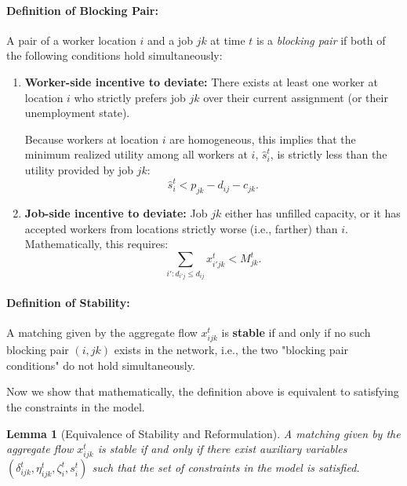 \documentclass[trsc,nonblindrev]{informs3noheader}
\newtheorem{lemma}{Lemma}
\begin{document}
\paragraph{Definition of Blocking Pair:} A pair of a worker location $i$ and a job $jk$ at time $t$ is a \textit{blocking pair} if both of the following conditions hold simultaneously:
\begin{enumerate}
    \item \textbf{Worker-side incentive to deviate:} There exists at least one worker at location $i$ who strictly prefers job $jk$ over their current assignment (or their unemployment state). 
    
    Because workers at location $i$ are homogeneous, this implies that the minimum realized utility among all workers at $i$, $\hat{s}_i^t$, is strictly less than the utility provided by job $jk$:
    \begin{equation*}
        \hat{s}_i^t < p_{jk} - d_{ij} - c_{jk}.
    \end{equation*}

    \item \textbf{Job-side incentive to deviate:} Job $jk$ either has unfilled capacity, or it has accepted workers from locations strictly worse (i.e., farther) than $i$. Mathematically, this requires:
    \begin{equation*}
        \sum_{i': d_{i'j} \le d_{ij}} x_{i'jk}^t < M_{jk}^t.
    \end{equation*}
\end{enumerate}

\paragraph{Definition of Stability:} A matching given by the aggregate flow $x_{ijk}^t$ is \textbf{stable} if and only if no such blocking pair $(i,jk)$ exists in the network, i.e., the two "blocking pair conditions" do not hold simultaneously. 

Now we show that mathematically, the definition above is equivalent to satisfying the constraints in the model.

\begin{lemma}[Equivalence of Stability and Reformulation]
    A matching given by the aggregate flow $x_{ijk}^t$ is stable if and only if there exist auxiliary variables $(\delta_{ijk}^t, \eta_{ijk}^t, \zeta_i^t, s_i^t)$ such that the set of constraints in the model is satisfied.
\end{lemma}
\end{document}
